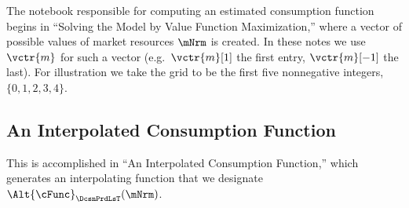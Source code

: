 \documentclass[SolvingMicroDSOPs]{subfiles}
\begin{document}

The notebook responsible for computing an estimated consumption function begins in ``Solving the Model by Value Function Maximization,'' where a vector of possible values of market resources $\mNrm$ is created.  In these notes we use $\vctr{m}$ for such a vector (e.g.\ $\vctr{m}[1]$ the first entry, $\vctr{m}[-1]$ the last).  For illustration we take the grid to be the first five nonnegative integers, $\{0,1,2,3,4\}$.



\hypertarget{an-interpolated-consumption-function}{}
\subsection{An Interpolated Consumption Function} \label{subsec:LinInterp}


This is accomplished in ``An Interpolated Consumption Function,'' which generates an interpolating function that we designate $\Alt{\cFunc}_{\DcsnPrdLsT}(\mNrm)$. %
\end{document}
